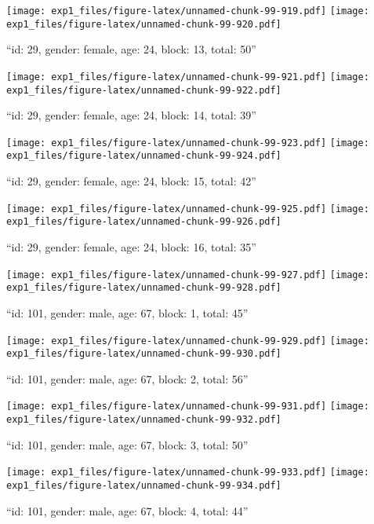 \documentclass[,]{article}
\begin{document}
\texttt{[image: exp1\_files/figure-latex/unnamed-chunk-99-919.pdf]}
\texttt{[image: exp1\_files/figure-latex/unnamed-chunk-99-920.pdf]}

\newpage
[1] 

``id: 29, gender: female, age: 24, block: 13, total: 50''

\texttt{[image: exp1\_files/figure-latex/unnamed-chunk-99-921.pdf]}
\texttt{[image: exp1\_files/figure-latex/unnamed-chunk-99-922.pdf]}

\newpage
[1] 

``id: 29, gender: female, age: 24, block: 14, total: 39''

\texttt{[image: exp1\_files/figure-latex/unnamed-chunk-99-923.pdf]}
\texttt{[image: exp1\_files/figure-latex/unnamed-chunk-99-924.pdf]}

\newpage
[1] 

``id: 29, gender: female, age: 24, block: 15, total: 42''

\texttt{[image: exp1\_files/figure-latex/unnamed-chunk-99-925.pdf]}
\texttt{[image: exp1\_files/figure-latex/unnamed-chunk-99-926.pdf]}

\newpage
[1] 

``id: 29, gender: female, age: 24, block: 16, total: 35''

\texttt{[image: exp1\_files/figure-latex/unnamed-chunk-99-927.pdf]}
\texttt{[image: exp1\_files/figure-latex/unnamed-chunk-99-928.pdf]}

\newpage
[1] 

``id: 101, gender: male, age: 67, block: 1, total: 45''

\texttt{[image: exp1\_files/figure-latex/unnamed-chunk-99-929.pdf]}
\texttt{[image: exp1\_files/figure-latex/unnamed-chunk-99-930.pdf]}

\newpage
[1] 

``id: 101, gender: male, age: 67, block: 2, total: 56''

\texttt{[image: exp1\_files/figure-latex/unnamed-chunk-99-931.pdf]}
\texttt{[image: exp1\_files/figure-latex/unnamed-chunk-99-932.pdf]}

\newpage
[1] 

``id: 101, gender: male, age: 67, block: 3, total: 50''

\texttt{[image: exp1\_files/figure-latex/unnamed-chunk-99-933.pdf]}
\texttt{[image: exp1\_files/figure-latex/unnamed-chunk-99-934.pdf]}

\newpage
[1] 

``id: 101, gender: male, age: 67, block: 4, total: 44''
\end{document}

